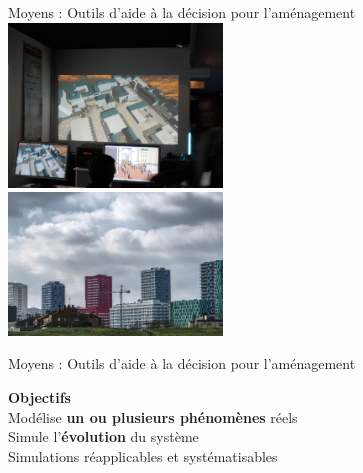 \documentclass[xcolor=table]{beamer}
\begin{document}
\begin{frame}{Moyens : Outils d'aide à la décision pour l'aménagement}
\centering
		\includegraphics[width=5.7cm]{Images/bureau.jpg}	
\\
		\includegraphics[width=5.7cm]{Images/simcity.jpg}	
\end{frame}

\begin{frame}{Moyens : Outils d'aide à la décision pour l'aménagement}
\begin{block}{}
	\textbf{Objectifs}\\
	Modélise \textbf{un ou plusieurs phénomènes} réels\\
	Simule l'\textbf{évolution} du système\\
	Simulations réapplicables et systématisables\\
\end{block}
\end{frame}
\end{document}
